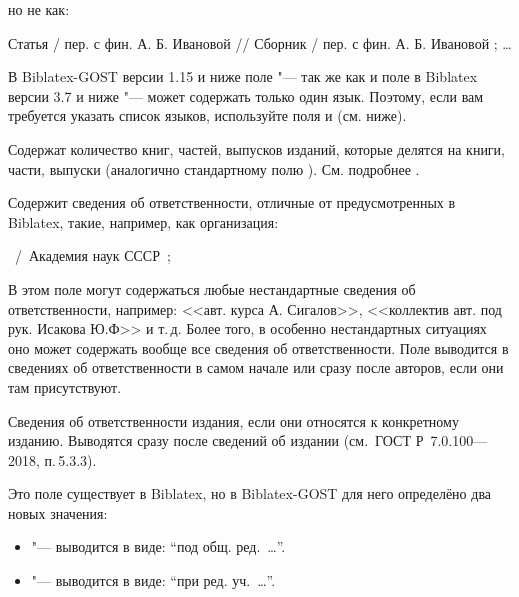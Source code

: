 \documentclass[10pt,a4paper,headings=small,numbers=enddot,english,russian]{ltxdockit}
\newcommand*{\biblatex}{Biblatex\xspace}
\newcommand*{\biblatexgost}{Biblatex-GOST\xspace}
\newcommand*{\gostbibname}[1][]{ГОСТ#1 Р~7.0.100---2018\xspace}
\newcommand*{\gostbibref}[2][]{\gostbibname[#1], п.\,#2\xspace}
\newenvironment{bibexample}{\begin{list}
     {}
     {\setlength{\leftmargin}{\parindent}%
      \setlength{\itemindent}{-\leftmargin}%
      \setlength{\parsep}{0pt}}}
  {\end{list}}
\begin{document}
\begin{fieldlist}
но не как:

\begin{bibexample}
\item Статья / пер. с фин. А. Б. Ивановой // Сборник / пер. с фин. А. Б. Ивановой ; \ldots
\end{bibexample}

В \biblatexgost версии 1.15 и ниже поле  "--- так же
как и поле  в \biblatex версии 3.7 и ниже "--- может
содержать только один язык. Поэтому, если вам требуется указать список языков,
используйте поля  и  (см. ниже).


Содержат количество книг, частей, выпусков изданий,
которые делятся на книги, части, выпуски (аналогично стандартному полю ). См.
подробнее .


Содержит сведения об ответственности, отличные от предусмотренных в \biblatex,
такие, например, как организация:

\begin{bibexample}
\item \textellipsis\ \slash\ Академия наук СССР\ ;\ \textellipsis
\end{bibexample}

В этом поле могут содержаться любые нестандартные сведения об ответственности,
например: <<авт. курса А. Сигалов>>,
<<коллектив авт. под рук. Исакова Ю.Ф>> и т.\,д.
Более того, в особенно нестандартных ситуациях
оно может содержать вообще все сведения об ответственности.
Поле  выводится в сведениях об ответственности в самом начале или
сразу после авторов, если они там присутствуют.


Сведения об ответственности издания, если они относятся к конкретному изданию.
Выводятся сразу после сведений об издании (см.~\gostbibref{5.3.3}).


Это поле существует в \biblatex, но в \biblatexgost для него определёно два новых
значения:
\begin{itemize}
\item {} "--- выводится в виде: \enquote{под общ. ред.~\ldots}.
\item {} "--- выводится в виде: \enquote{при ред. уч.~\ldots}.
\end{itemize}


\end{fieldlist}
\end{document}
